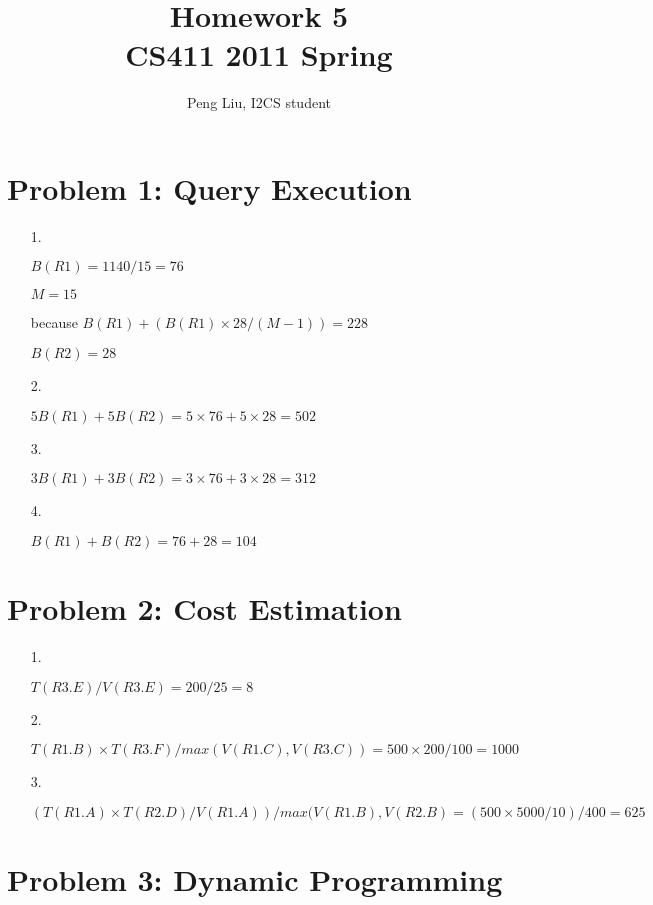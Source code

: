 \documentclass[letter,11pt]{article}
\author{Peng Liu, I2CS student}
\title{Homework 5\\CS411 2011 Spring}
\begin{document}
\lstset{language=SQL}
\maketitle

\section*{Problem 1: Query Execution}

\begin{enumerate}
\item[1.]

$B(R1) = 1140/15 = 76$

$M=15$

because $B(R1) + (B(R1) \times 28 /(M-1)) = 228$

$B(R2) = 28$ 

\item[2.]

$5B(R1)+5B(R2)=5\times76+5\times28=502$

\item[3.]

$3B(R1)+3B(R2)=3\times76+3\times28=312$

\item[4.]

$B(R1)+B(R2)=76+28=104$

\end{enumerate}

\section*{Problem 2: Cost Estimation}

\begin{enumerate}
\item[1.]

$T(R3.E)/V(R3.E) = 200/25 = 8$
    
\item[2.]
  
$T(R1.B) \times T(R3.F)/max(V(R1.C), V(R3.C)) = 500\times200/100 = 1000$
  
\item[3.]

$(T(R1.A) \times T(R2.D) / V(R1.A))/max(V(R1.B),V(R2.B) = (500\times5000/10)/400 = 625$

\end{enumerate}

\section*{Problem 3: Dynamic Programming}
\end{document}
